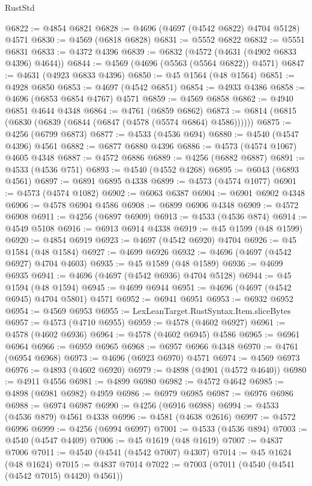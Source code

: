 \begin{lexlean}{RustStd}
\begin{coremodule}
@6822 := @4854 @6821
@6828 := @4696 (@4697 (@4542 @6822) @4704 @5128) @4571
@6830 := @4569 (@6818 @6828)
@6831 := @5552 @6822
@6832 := @5551 @6831
@6833 := @4372 @4396
@6839 := @6832 (@4572 (@4631 (@4902 @6833 @4396) @4644))
@6844 := @4569 (@4696 (@5563 (@5564 @6822)) @4571)
@6847 := @4631 (@4923 @6833 @4396)
@6850 := @45 @1564 (@48 @1564)
@6851 := @4928 @6850
@6853 := @4697 (@4542 @6851)
@6854 := @4933 @4386
@6858 := @4696 (@6853 @6854 @4767) @4571
@6859 := @4569 @6858
@6862 := @4940 @6851 @4644 @4348
@6864 := @4761 (@6859 @6862)
@6873 := @6814 (@6815 (@6830 (@6839 (@6844 (@6847 (@4578 (@5574 @6864) @4586))))))
@6875 := @4256 (@6799 @6873)
@6877 := @4533 (@4536 @694)
@6880 := @4540 (@4547 @4396) @4561
@6882 := @6877 @6880 @4396
@6886 := @4573 (@4574 @1067) @4605 @4348
@6887 := @4572 @6886
@6889 := @4256 (@6882 @6887)
@6891 := @4533 (@4536 @751)
@6893 := @4540 (@4552 @4268)
@6895 := @6043 (@6893 @4561)
@6897 := @6891 @6895 @4338
@6899 := @4573 (@4574 @1077)
@6901 := @4573 (@4574 @1082)
@6902 := @6063 @6387
@6904 := @6901 @6902 @4348
@6906 := @4578 @6904 @4586
@6908 := @6899 @6906 @4348
@6909 := @4572 @6908
@6911 := @4256 (@6897 @6909)
@6913 := @4533 (@4536 @874)
@6914 := @4549 @5108
@6916 := @6913 @6914 @4338
@6919 := @45 @1599 (@48 @1599)
@6920 := @4854 @6919
@6923 := @4697 (@4542 @6920) @4704
@6926 := @45 @1584 (@48 @1584)
@6927 := @4699 @6926
@6932 := @4696 (@4697 (@4542 @6927) @4704 @4603)
@6935 := @45 @1589 (@48 @1589)
@6936 := @4699 @6935
@6941 := @4696 (@4697 (@4542 @6936) @4704 @5128)
@6944 := @45 @1594 (@48 @1594)
@6945 := @4699 @6944
@6951 := @4696 (@4697 (@4542 @6945) @4704 @5801) @4571
@6952 := @6941 @6951
@6953 := @6932 @6952
@6954 := @4569 @6953
@6955 := LexLeanTarget.RustSyntax.Item.sliceBytes
@6957 := @4573 (@4710 @6955)
@6959 := @4578 (@4602 @6927)
@6961 := @4578 (@4602 @6936)
@6964 := @4578 (@4602 @6945) @4586
@6965 := @6961 @6964
@6966 := @6959 @6965
@6968 := @6957 @6966 @4348
@6970 := @4761 (@6954 @6968)
@6973 := @4696 (@6923 @6970) @4571
@6974 := @4569 @6973
@6976 := @4893 (@4602 @6920)
@6979 := @4898 (@4901 (@4572 @4640))
@6980 := @4911 @4556
@6981 := @4899 @6980
@6982 := @4572 @4642
@6985 := @4898 (@6981 @6982) @4959
@6986 := @6979 @6985
@6987 := @6976 @6986
@6988 := @6974 @6987
@6990 := @4256 (@6916 @6988)
@6994 := @4533 (@4536 @879) @4561 @4338
@6996 := @4581 (@4638 @2616)
@6997 := @4572 @6996
@6999 := @4256 (@6994 @6997)
@7001 := @4533 (@4536 @894)
@7003 := @4540 (@4547 @4409)
@7006 := @45 @1619 (@48 @1619)
@7007 := @4837 @7006
@7011 := @4540 (@4541 (@4542 @7007) @4307)
@7014 := @45 @1624 (@48 @1624)
@7015 := @4837 @7014
@7022 := @7003 (@7011 (@4540 (@4541 (@4542 @7015) @4420) @4561))

\end{coremodule}
\end{lexlean}
